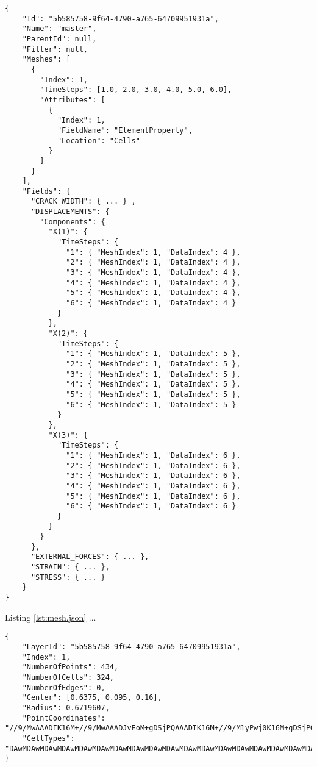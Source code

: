 \begin{lstlisting}[style=json,caption=Example of summary.json document,label=lst:summary.json]
{
    "Id": "5b585758-9f64-4790-a765-64709951931a",
    "Name": "master",
    "ParentId": null,
    "Filter": null,
    "Meshes": [
      {
        "Index": 1,
        "TimeSteps": [1.0, 2.0, 3.0, 4.0, 5.0, 6.0],
        "Attributes": [
          {
            "Index": 1,
            "FieldName": "ElementProperty",
            "Location": "Cells"
          }
        ]
      }
    ],
    "Fields": {
      "CRACK_WIDTH": { ... } ,
      "DISPLACEMENTS": {
        "Components": {
          "X(1)": {
            "TimeSteps": {
              "1": { "MeshIndex": 1, "DataIndex": 4 },
              "2": { "MeshIndex": 1, "DataIndex": 4 },
              "3": { "MeshIndex": 1, "DataIndex": 4 },
              "4": { "MeshIndex": 1, "DataIndex": 4 },
              "5": { "MeshIndex": 1, "DataIndex": 4 },
              "6": { "MeshIndex": 1, "DataIndex": 4 }
            }
          },
          "X(2)": {
            "TimeSteps": {
              "1": { "MeshIndex": 1, "DataIndex": 5 },
              "2": { "MeshIndex": 1, "DataIndex": 5 },
              "3": { "MeshIndex": 1, "DataIndex": 5 },
              "4": { "MeshIndex": 1, "DataIndex": 5 },
              "5": { "MeshIndex": 1, "DataIndex": 5 },
              "6": { "MeshIndex": 1, "DataIndex": 5 }
            }
          },
          "X(3)": {
            "TimeSteps": {
              "1": { "MeshIndex": 1, "DataIndex": 6 },
              "2": { "MeshIndex": 1, "DataIndex": 6 },
              "3": { "MeshIndex": 1, "DataIndex": 6 },
              "4": { "MeshIndex": 1, "DataIndex": 6 },
              "5": { "MeshIndex": 1, "DataIndex": 6 },
              "6": { "MeshIndex": 1, "DataIndex": 6 }
            }
          }
        }
      },
      "EXTERNAL_FORCES": { ... },
      "STRAIN": { ... },
      "STRESS": { ... }
    }
}
\end{lstlisting}

Listing \ref{lst:mesh.json} ...

\begin{lstlisting}[style=json,caption=Example of mesh.json document,label=lst:mesh.json]
{
    "LayerId": "5b585758-9f64-4790-a765-64709951931a",
    "Index": 1,
    "NumberOfPoints": 434,
    "NumberOfCells": 324,
    "NumberOfEdges": 0,
    "Center": [0.6375, 0.095, 0.16],
    "Radius": 0.6719607,
    "PointCoordinates": "//9/MwAAADIK16M+//9/MwAAADJvEoM+gDSjPQAAADIK16M+//9/M1yPwj0K16M+gDSjPQAAAD...",
    "CellTypes": "DAwMDAwMDAwMDAwMDAwMDAwMDAwMDAwMDAwMDAwMDAwMDAwMDAwMDAwMDAwMDAwMDAwMDAwMDAwMDAwMD..."
}
\end{lstlisting}

